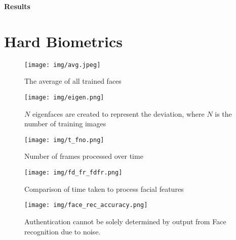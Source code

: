 \documentclass[12pt]{article}			%
\begin{document}

\begin{center}
	{\LARGE \bf Results}
\end{center}

\section{Hard Biometrics}
\begin{figure}[h]
	\centering
	\texttt{[image: img/avg.jpeg]}
	\caption{ \small The average of all trained faces } 
	\label{fig:hb1}
\end{figure}

\begin{figure}[b]
	\centering
	\texttt{[image: img/eigen.png]}
	\caption{ \small $N$ eigenfaces are created to represent the deviation, where $N$ is the number of training images } 
	\label{fig:hb2}
\end{figure}

\begin{figure}[h]
	\centering
	\texttt{[image: img/t\_fno.png]}
	\caption{ \small Number of frames processed over time}
	\label{fig:hb3}
\end{figure}

\begin{figure}[h]
	\centering
	\texttt{[image: img/fd\_fr\_fdfr.png]}
	\caption{ \small Comparison of time taken to process facial features }
	\label{fig:hb4}
\end{figure}

\begin{figure}[t]
	\centering
	\texttt{[image: img/face\_rec\_accuracy.png]}
	\caption{ \small Authentication cannot be solely determined by output from Face recognition due to noise. }
	\label{fig:hb5}
\end{figure}
\end{document}
